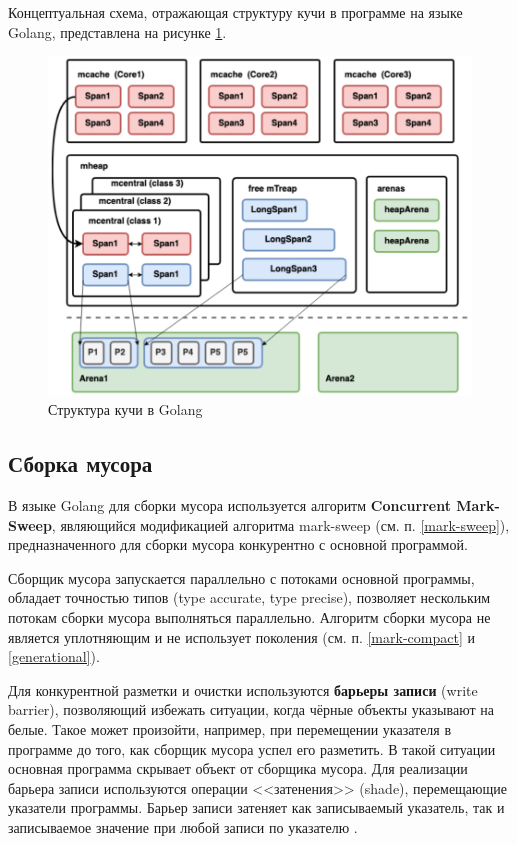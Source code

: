 Концептуальная схема, отражающая структуру кучи в программе на языке Golang, представлена на рисунке \ref{fig:golang_heap}.

\begin{figure}[H]
	\centering
	\includegraphics[width=\textwidth]{assets/golang-heap.png}
	\caption{Структура кучи в Golang}
	\label{fig:golang_heap}
\end{figure}



\subsection{Сборка мусора}

В языке Golang для сборки мусора используется алгоритм \textbf{Concurrent Mark-Sweep}, являющийся модификацией алгоритма mark-sweep (см. п. \ref{mark-sweep}), предназначенного для сборки мусора конкурентно с основной программой. \cite{golang_gc}

Сборщик мусора запускается параллельно с потоками основной программы, обладает точностью типов (type accurate, type precise), позволяет нескольким потокам сборки мусора выполняться параллельно. Алгоритм сборки мусора не является уплотняющим и не использует поколения (см. п. \ref{mark-compact} и \ref{generational}). 

Для конкурентной разметки и очистки используются \textbf{барьеры записи} (write barrier), позволяющий избежать ситуации, когда чёрные объекты указывают на белые. Такое может произойти, например, при перемещении указателя в программе до того, как сборщик мусора успел его разметить. В такой ситуации основная программа скрывает объект от сборщика мусора. \cite{golang_gc} Для реализации барьера записи используются операции <<затенения>> (shade), перемещающие указатели программы. Барьер записи затеняет как записываемый указатель, так и записываемое значение при любой записи по указателю \cite{golang_barrier}. 


